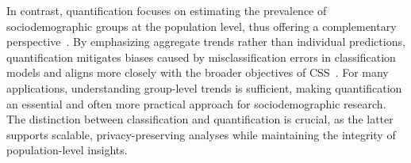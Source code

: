 In contrast, quantification focuses on estimating the prevalence of sociodemographic groups at the population level, thus offering a complementary perspective~\cite{gonzalez2017review}.
By emphasizing aggregate trends rather than individual predictions, quantification mitigates biases caused by misclassification errors in classification models and aligns more closely with the broader objectives of CSS~\cite{nature2021digital}.
For many applications, understanding group-level trends is sufficient, making quantification an essential and often more practical approach for sociodemographic research.
The distinction between classification and quantification is crucial, as the latter supports scalable, privacy-preserving analyses while maintaining the integrity of population-level insights.
